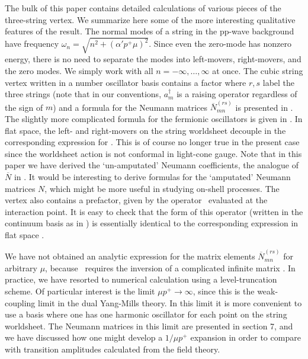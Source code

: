 
The bulk of this paper contains detailed calculations of various
pieces of the three-string vertex. We summarize here some of the
more interesting qualitative features of the result.
The normal modes of a string in the pp-wave background
have frequency $\omega_n = \sqrt{n^2 + (\alpha' p^+ \mu)^2}$.
Since even the zero-mode
has nonzero energy, there is no need to separate the modes into
left-movers, right-movers, and the zero modes.  We simply work
with all $n=-\infty,\ldots,\infty$ at once.
The cubic string vertex written in a number oscillator basis
contains a factor
\eqn\answer{
\exp \left[  {1 \over 2} \sum_{r,s=1}^3 \sum_{m,n=-\infty}^\infty
a_{m (r)}^\dagger \overline{N}^{(rs)}_{mn} a_{n(s)}^{\dagger}
\right]|0\rangle,
}
where $r,s$ label the three strings (note that
in our conventions,
$a_m^\dagger$ is a raising operator regardless of the sign of $m$)
and a formula for the Neumann
matrices $\overline{N}^{(rs)}_{mn}$ is presented in \neuman.
The slightly more complicated formula for the fermionic
oscillators is given in \ebstring.
In flat space, the left- and right-movers on the string worldsheet
decouple in the corresponding expression for \answer.  This is
of course no longer true in the present case since the worldsheet
action is not conformal in light-cone gauge.
Note that in this paper we have derived the `un-amputated'
Neumann coefficients, the analogue of $\overline{N}$ in \GSW.
It would be interesting to derive formulas for the `amputated'
Neumann matrices $N$, which might be more useful in studying on-shell
processes.
The vertex also contains a prefactor, given by the operator
\svtstring\ evaluated at the interaction point.
It is easy to check that the form of this operator (written in
the continuum basis as in \limits) is essentially identical to the corresponding
expression in flat space \GSB.

We have not obtained an analytic expression for the matrix
elements $\overline{N}^{(rs)}_{mn}$
for arbitrary $\mu$, because \bvertex\ requires
the inversion of a complicated infinite matrix \gammadef.  In practice, we have
resorted to numerical calculation using a level-truncation scheme.
Of particular interest is the limit $\mu p^+ \to \infty$, since this
is the weak-coupling limit in the dual Yang-Mills theory.
In this limit it is more convenient to use a basis where one
has one harmonic oscillator for each point on the string worldsheet.
The Neumann matrices in this limit are presented in section 7, and we
have discussed how one might develop a $1/\mu p^+$ expansion
in order to compare with transition
amplitudes calculated from the field theory.

